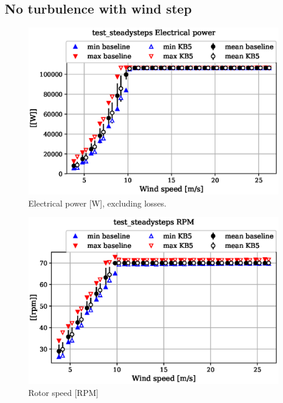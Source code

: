 
\subsection{No turbulence with wind step}
\label{sec:baseline-vs-KB6:test_steadysteps}

\begin{figure}[!ht]
\begin{center}
	\includegraphics[width=.85\linewidth]{figures/baseline-vs-KB6/test_steadysteps/DLL-generator_servo-inpvec-2_AA0007_AA0003.eps}
\end{center}
\caption{Electrical power [W], excluding losses.}
\label{fig:baseline-vs-KB6:test_steadysteps:power}
\end{figure}

\begin{figure}[!ht]
\begin{center}
	\includegraphics[width=.85\linewidth]{figures/baseline-vs-KB6/test_steadysteps/bearing-shaft_rot-angle_speed-rpm_AA0007_AA0003.eps}
\end{center}
\caption{Rotor speed [RPM]}
\label{fig:baseline-vs-KB6:test_steadysteps:rpm}
\end{figure}

